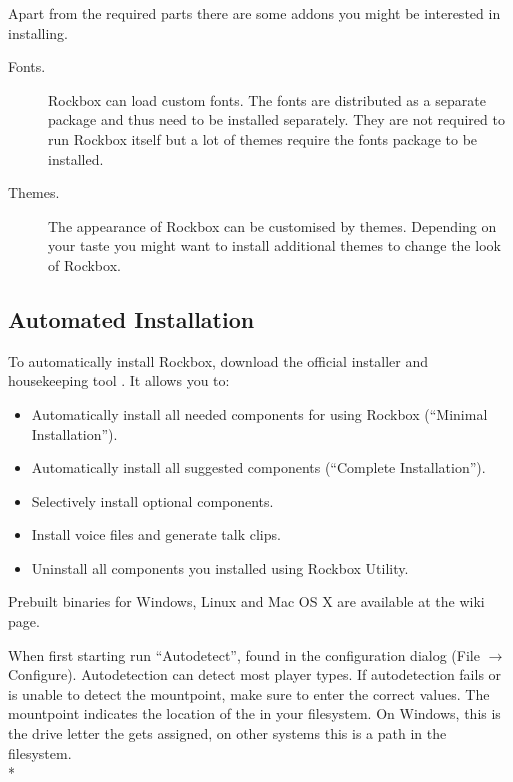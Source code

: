  {
    Apart from the required parts there are some addons you might be interested
    in installing.
    \begin{description}
    \item[Fonts.] Rockbox can load custom fonts. The fonts are
        distributed as a separate package and thus need to be installed
        separately. They are not required to run Rockbox itself but
        a lot of themes require the fonts package to be installed.

    \item[Themes.] The appearance of Rockbox can be customised by themes. Depending
        on your taste you might want to install additional themes to change
        the look of Rockbox.
    \end{description}
}

\subsection{Automated Installation}

To automatically install Rockbox, download the official installer and
housekeeping tool . It allows you to:
\begin{itemize}
\item Automatically install all needed components for using Rockbox
        (``Minimal Installation'').
\item Automatically install all suggested components (``Complete Installation'').
\item Selectively install optional components.
\item Install voice files and generate talk clips.
\item Uninstall all components you installed using Rockbox Utility.
\end{itemize}

Prebuilt binaries for Windows, Linux and Mac OS X are
available at the  wiki page.\\


When first starting  run ``Autodetect'',
found in the configuration dialog (File $\rightarrow$ Configure). Autodetection
can detect most player types. If autodetection fails or is unable to detect 
the mountpoint, make sure to enter the correct values. The mountpoint indicates
the location of the \dap{} in your filesystem. On Windows, this is the drive
letter the \dap{} gets assigned, on other systems this is a path in the
filesystem.\\*

